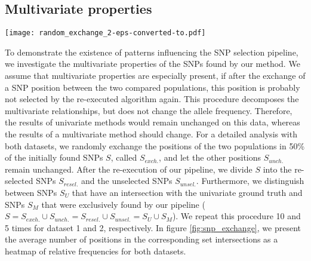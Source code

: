 \documentclass{article}
\begin{document}
\subsection{Multivariate properties}
\begin{figure*}[t]
    \centering
    \texttt{[image: random\_exchange\_2-eps-converted-to.pdf]}
    \caption{Average results of the randomized SNP exchange with absolute and relative frequencies. The relative values of a plot are the percentages of the 4 different subsets in the exchanged and non-exchanged case. A SNP is denoted as re-selected if the pipeline choose the SNP again after re-execution and as unselected else. A SNP is denoted as univariate if the position was also chosen by the corresponding univariate method and as multivariate else. The two upper plots show the results of dataset 1 and the lower plots show the results of dataset 2.}
    \label{fig:snp_exchange}
\end{figure*}
To demonstrate the existence of patterns influencing the SNP selection pipeline, we investigate the multivariate properties of the SNPs found by our method.
We assume that multivariate properties are especially present, if after the exchange of a SNP position between the two compared populations, this position is probably not selected by the re-executed algorithm again. This procedure decomposes the multivariate relationships, but does not change the allele frequency. Therefore, the results of univariate methods would remain unchanged on this data, whereas the results of a multivariate method should change. 
For a detailed analysis with both datasets, we randomly exchange the positions of the two populations in 50\% of the initially found SNPs $S$, called $S_{exch.}$, and let the other positions $S_{unch.}$ remain unchanged. After the re-execution of our pipeline, we divide $S$ into the re-selected SNPs $S_{resel.}$ and the unselected SNPs $S_{unsel.}$. 
Furthermore, we distinguish between SNPs $S_{U}$ that have an intersection with the univariate ground truth and SNPs $S_{M}$ that were exclusively found by our pipeline ($S=S_{exch.}\cup S_{unch.}=S_{resel.}\cup S_{unsel.}=S_{U}\cup S_{M}$). 
We repeat this procedure 10 and 5 times for dataset 1 and 2, respectively. In figure \ref{fig:snp_exchange}, we present the average number of positions in the corresponding set intersections as a heatmap of relative frequencies for both datasets. 
\end{document}
